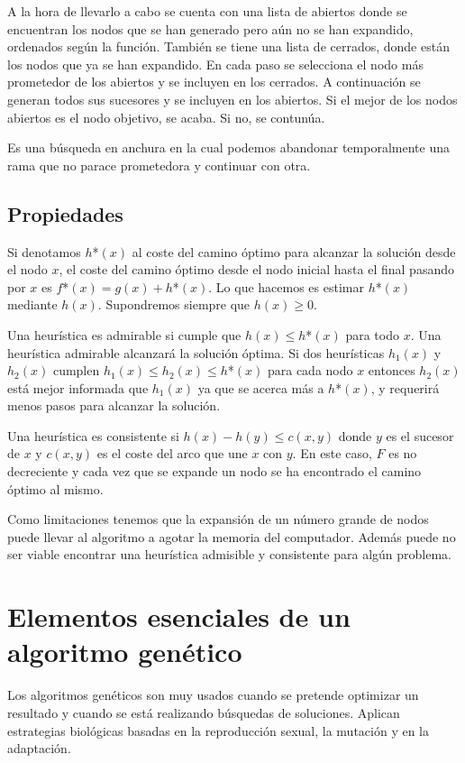 \documentclass[12pt]{article}
\begin{document}
A la hora de llevarlo a cabo se cuenta con una lista de abiertos donde
se encuentran los nodos que se han generado pero aún no se han
expandido, ordenados según la función. También se tiene una lista de
cerrados, donde están los nodos que ya se han expandido. En cada paso
se selecciona el nodo más prometedor de los abiertos y se incluyen en
los cerrados. A continuación se generan todos sus sucesores y se
incluyen en los abiertos. Si el mejor de los nodos abiertos es el nodo
objetivo, se acaba. Si no, se contunúa.

Es una búsqueda en anchura en la cual podemos abandonar temporalmente
una rama que no parace prometedora y continuar con otra.

\subsection{Propiedades}

Si denotamos $h$*$(x)$ al coste del camino óptimo para alcanzar la
solución desde el nodo $x$, el coste del camino óptimo desde el nodo
inicial hasta el final pasando por $x$ es $f$*$(x)=g(x)+h$*$(x)$. Lo
que hacemos es estimar $h$*$(x)$ mediante $h(x)$. Supondremos siempre
que $h(x)\geq 0$.

Una heurística es admirable si cumple que $h(x) \leq h$*$(x)$ para
todo $x$. Una heurística admirable alcanzará la solución óptima. Si
dos heurísticas $h_1(x)$ y $h_2(x)$ cumplen
$h_1(x) \leq h_2(x) \leq h$*$(x)$ para cada nodo $x$ entonces $h_2(x)$
está mejor informada que $h_1(x)$ ya que se acerca más a $h$*$(x)$, y
requerirá menos pasos para alcanzar la solución.

Una heurística es consistente si $h(x) - h(y) \leq c(x,y)$ donde $y$
es el sucesor de $x$ y $c(x,y)$ es el coste del arco que une $x$ con
$y$. En este caso, $F$ es no decreciente y cada vez que se expande un
nodo se ha encontrado el camino óptimo al mismo.

Como limitaciones tenemos que la expansión de un número grande de
nodos puede llevar al algoritmo a agotar la memoria del
computador. Además puede no ser viable encontrar una heurística
admisible y consistente para algún problema.

\section{Elementos esenciales de un algoritmo genético}

Los algoritmos genéticos son muy usados cuando se pretende optimizar
un resultado y cuando se está realizando búsquedas de
soluciones. Aplican estrategias biológicas basadas en la reproducción
sexual, la mutación y en la adaptación.
\end{document}
